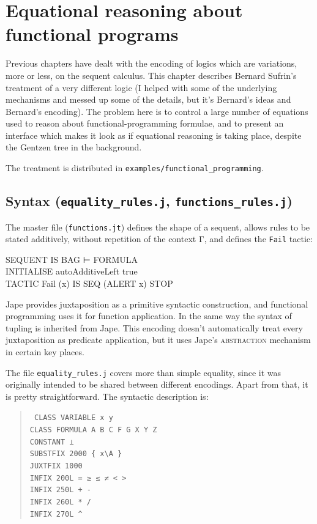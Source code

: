 \chapter{Equational reasoning about functional programs}
\label{chap:funcprog}

Previous chapters have dealt with the encoding of logics which are variations, more or less, on the sequent calculus. This chapter describes Bernard Sufrin's treatment of a very different logic (I helped with some of the underlying mechanisms and messed up some of the details, but it's Bernard's ideas and Bernard's encoding). The problem here is to control a large number of equations used to reason about functional-programming formulae, and to present an interface which makes it look as if equational reasoning is taking place, despite the Gentzen tree in the background. 

The treatment is distributed in \texttt{examples/functional\_programming}. 

\section{Syntax (\texttt{equality\_rules.j}, \texttt{functions\_rules.j})}

The master file (\texttt{functions.jt}) defines the shape of a sequent, allows rules to be stated additively, without repetition of the context Γ, and defines the \texttt{Fail} tactic:
\begin{japeish}
SEQUENT IS BAG ⊢ FORMULA \\
INITIALISE autoAdditiveLeft true \\
TACTIC Fail (x) IS SEQ (ALERT x) STOP
\end{japeish}

Jape provides juxtaposition as a primitive syntactic construction, and functional programming uses it for function application. In the same way the syntax of tupling is inherited from Jape. This encoding doesn't automatically treat every juxtaposition as predicate application, but it uses Jape's \textsc{abstraction} mechanism in certain key places.

The file \texttt{equality\_rules.j} covers more than simple equality, since it was originally intended to be shared between different encodings. Apart from that, it is pretty straightforward. The syntactic description is:
\begin{quote}\tt\small
CLASS VARIABLE x y \\
CLASS FORMULA A B C F G X Y Z \\
CONSTANT ⊥ \\
 
SUBSTFIX    2000 \{ x\;\textbackslash\;A \} \\
JUXTFIX 1000 \\
INFIX       200L    = ≥ ≤ ≠ < > \\
INFIX       250L    + - \\
INFIX       260L    * / \\
INFIX       270L    \textasciicircum \\
\end{quote}

